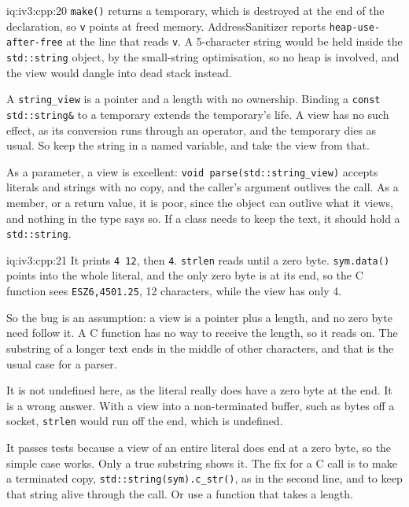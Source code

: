 \begin{solution}{iq:iv3:cpp:20}
\texttt{make()} returns a temporary, which is destroyed at the end of the declaration, so \texttt{v} points at freed memory. AddressSanitizer reports \texttt{heap-use-after-free} at the line that reads \texttt{v}. A 5-character string would be held inside the \texttt{std::string} object, by the small-string optimisation, so no heap is involved, and the view would dangle into dead stack instead.

A \texttt{string\_view} is a pointer and a length with no ownership. Binding a \texttt{const std::string\&} to a temporary extends the temporary's life. A view has no such effect, as its conversion runs through an operator, and the temporary dies as usual. So keep the string in a named variable, and take the view from that.

As a parameter, a view is excellent: \texttt{void parse(std::string\_view)} accepts literals and strings with no copy, and the caller's argument outlives the call. As a member, or a return value, it is poor, since the object can outlive what it views, and nothing in the type says so. If a class needs to keep the text, it should hold a \texttt{std::string}.

\end{solution}

\begin{solution}{iq:iv3:cpp:21}
It prints \texttt{4 12}, then \texttt{4}. \texttt{strlen} reads until a zero byte. \texttt{sym.data()} points into the whole literal, and the only zero byte is at its end, so the C function sees \texttt{ESZ6,4501.25}, 12 characters, while the view has only 4.

So the bug is an assumption: a view is a pointer plus a length, and no zero byte need follow it. A C function has no way to receive the length, so it reads on. The substring of a longer text ends in the middle of other characters, and that is the usual case for a parser.

It is not undefined here, as the literal really does have a zero byte at the end. It is a wrong answer. With a view into a non-terminated buffer, such as bytes off a socket, \texttt{strlen} would run off the end, which is undefined.

It passes tests because a view of an entire literal does end at a zero byte, so the simple case works. Only a true substring shows it. The fix for a C call is to make a terminated copy, \texttt{std::string(sym).c\_str()}, as in the second line, and to keep that string alive through the call. Or use a function that takes a length.

\end{solution}

